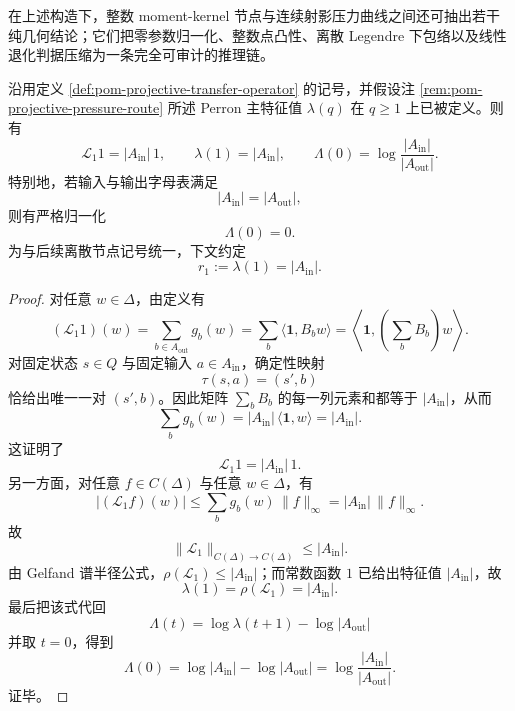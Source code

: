 在上述构造下，整数 moment-kernel 节点与连续射影压力曲线之间还可抽出若干纯几何结论；它们把零参数归一化、整数点凸性、离散 Legendre 下包络以及线性退化判据压缩为一条完全可审计的推理链。

\begin{theorem}[射影压力曲线在零参数处的精确归一化常数]\label{thm:pom-projective-pressure-zero-normalization}
沿用定义 \ref{def:pom-projective-transfer-operator} 的记号，并假设注 \ref{rem:pom-projective-pressure-route} 所述 Perron 主特征值 \(\lambda(q)\) 在 \(q\ge 1\) 上已被定义。则有
\[
\mathcal{L}_1 1 = |A_{\mathrm{in}}|\,1,
\qquad
\lambda(1)=|A_{\mathrm{in}}|,
\qquad
\Lambda(0)=\log\frac{|A_{\mathrm{in}}|}{|A_{\mathrm{out}}|}.
\]
特别地，若输入与输出字母表满足
\[
|A_{\mathrm{in}}|=|A_{\mathrm{out}}|,
\]
则有严格归一化
\[
\boxed{\;\Lambda(0)=0.\;}
\]
为与后续离散节点记号统一，下文约定
\[
r_1:=\lambda(1)=|A_{\mathrm{in}}|.
\]
\end{theorem}
\begin{proof}
对任意 \(w\in\Delta\)，由定义有
\[
(\mathcal{L}_1 1)(w)=\sum_{b\in A_{\mathrm{out}}}g_b(w)
=\sum_b \langle \mathbf{1},B_b w\rangle
=\left\langle \mathbf{1},\left(\sum_b B_b\right)w\right\rangle.
\]
对固定状态 \(s\in Q\) 与固定输入 \(a\in A_{\mathrm{in}}\)，确定性映射
\[
\tau(s,a)=(s',b)
\]
恰给出唯一一对 \((s',b)\)。因此矩阵 \(\sum_b B_b\) 的每一列元素和都等于 \(|A_{\mathrm{in}}|\)，从而
\[
\sum_b g_b(w)=|A_{\mathrm{in}}|\,\langle \mathbf{1},w\rangle=|A_{\mathrm{in}}|.
\]
这证明了
\[
\mathcal{L}_1 1=|A_{\mathrm{in}}|\,1.
\]
另一方面，对任意 \(f\in C(\Delta)\) 与任意 \(w\in\Delta\)，有
\[
|(\mathcal{L}_1 f)(w)|
\le
\sum_b g_b(w)\,\|f\|_\infty
=
|A_{\mathrm{in}}|\,\|f\|_\infty.
\]
故
\[
\|\mathcal{L}_1\|_{C(\Delta)\to C(\Delta)}\le |A_{\mathrm{in}}|.
\]
由 Gelfand 谱半径公式，\(\rho(\mathcal{L}_1)\le |A_{\mathrm{in}}|\)；而常数函数 \(1\) 已给出特征值 \(|A_{\mathrm{in}}|\)，故
\[
\lambda(1)=\rho(\mathcal{L}_1)=|A_{\mathrm{in}}|.
\]
最后把该式代回
\[
\Lambda(t)=\log\lambda(t+1)-\log|A_{\mathrm{out}}|
\]
并取 \(t=0\)，得到
\[
\Lambda(0)=\log|A_{\mathrm{in}}|-\log|A_{\mathrm{out}}|
=
\log\frac{|A_{\mathrm{in}}|}{|A_{\mathrm{out}}|}.
\]
证毕。
\end{proof}

